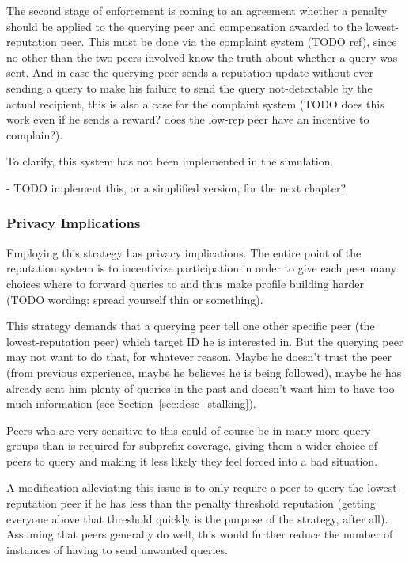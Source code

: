The second stage of enforcement is coming to an agreement whether a penalty
should be applied to the querying peer and compensation awarded to the
lowest-reputation peer. This must be done via the complaint system (TODO ref),
since no other than the two peers involved know the truth about whether a query
was sent. And in case the querying peer sends a reputation update without ever
sending a query to make his failure to send the query not-detectable by the
actual recipient, this is also a case for the complaint system (TODO does this
work even if he sends a reward? does the low-rep peer have an incentive to
complain?).

To clarify, this system has not been implemented in the simulation.

- TODO implement this, or a simplified version, for the next chapter?

\subsubsection{Privacy Implications}
\label{sec:selection_overlap_rep_sorted_privacy}
Employing this strategy has privacy implications. The entire point of the
reputation system is to incentivize participation in order to give each peer
many choices where to forward queries to and thus make profile building harder
(TODO wording: spread yourself thin or something).

This strategy demands that a querying peer tell one other specific peer (the
lowest-reputation peer) which target ID he is interested in. But the querying
peer may not want to do that, for whatever reason. Maybe he doesn't trust the
peer (from previous experience, maybe he believes he is being followed), maybe
he has already sent him plenty of queries in the past and doesn't want him to
have too much information (see Section~\ref{sec:desc_stalking}).

Peers who are very sensitive to this could of course be in many more query
groups than is required for subprefix coverage, giving them a wider choice of
peers to query and making it less likely they feel forced into a bad situation.

A modification alleviating this issue is to only require a peer to query the
lowest-reputation peer if he has less than the penalty threshold reputation
(getting everyone above that threshold quickly is the purpose of the strategy,
after all). Assuming that peers generally do well, this would further reduce the
number of instances of having to send unwanted queries.

